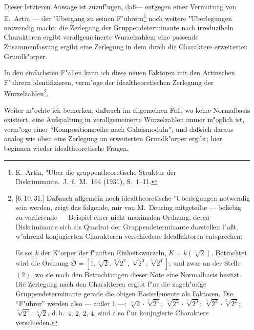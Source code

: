 \documentclass[12pt,a4paper]{article}
\theoremstyle{plain}
\begin{document}
Dieser letzteren Aussage ist zuzuf"ugen, da\ss --- entgegen einer Vermutung von E.\ Artin --- der "Ubergang zu seinen F"uhrern\footnote{E.\ Artin, "Uber die gruppentheoretische Struktur der Diskriminante.\ J.\ f.\ M.\ 164 (1931), S.\ 1--11.} noch weitere "Uberlegungen notwendig macht: die Zerlegung der Gruppendeterminante nach irreduzibeln Charakteren ergibt verallgemeinerte Wurzelzahlen; eine passende Zusammenfassung ergibt eine Zerlegung in dem durch die Charaktere erweiterten Grundk"orper.

In den einfachsten F"allen kann ich diese neuen Faktoren mit den Artinschen F"uhrern identifizieren, verm"oge der idealtheoretischen Zerlegung der Wurzelzahlen\footnote{[6.\,10.\,31.] Da\ss auch allgemein noch idealtheoretische "Uberlegungen notwendig sein werden, zeigt das folgende, mir von M.\ Deuring mitgeteilte --- beliebig zu variierende --- Beispiel einer nicht maximalen Ordnung, deren Diskriminante sich als Quadrat der Gruppendeterminante darstellen l"a\ss t, w"ahrend konjugierten Charakteren verschiedene Idealfaktoren entsprechen:

Es sei $k$ der K"orper der f"unften Einheitswurzeln, $K = k(\sqrt[5]{2})$. Betrachtet wird die Ordnung $\mathfrak{O} = [1, \sqrt[5]{2}, \sqrt[5]{2^2}, \sqrt[5]{2^3}, \sqrt[5]{2^4}]$; und zwar an der Stelle $(2)$, wo sie nach den Betrachtungen dieser Note eine Normalbasis besitzt. Die Zerlegung nach den Charakteren ergibt f"ur die zugeh"orige Gruppendeterminante gerade die obigen Basiselemente als Faktoren. Die ``F"uhrer'' werden also --- au\ss er 1 ---: $\sqrt[5]{2} \cdot \sqrt[5]{2^4}$; $\sqrt[5]{2^2} \cdot \sqrt[5]{2^3}$; $\sqrt[5]{2^3} \cdot \sqrt[5]{2^2}$; $\sqrt[5]{2^4} \cdot \sqrt[5]{2}$, d.\,h.\ $4$, $2$, $2$, $4$, sind also f"ur konjugierte Charaktere verschieden.}.

Weiter m"ochte ich bemerken, da\ss auch im allgemeinen Fall, wo keine Normalbasis existiert, eine Aufspaltung in verallgemeinerte Wurzelzahlen immer m"oglich ist, verm"oge einer ``Kompositionsreihe nach Galoismoduln''; und da\ss sich daraus analog wie oben eine Zerlegung im erweiterten Grundk"orper ergibt; hier beginnen wieder idealtheoretische Fragen.
\end{document}
